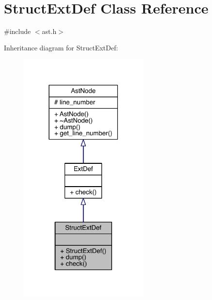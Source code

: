 \hypertarget{class_struct_ext_def}{}\section{Struct\+Ext\+Def Class Reference}
\label{class_struct_ext_def}


{\ttfamily \#include $<$ast.\+h$>$}



Inheritance diagram for Struct\+Ext\+Def\+:\nopagebreak
\begin{figure}[H]
\begin{center}
\leavevmode
\includegraphics[width=186pt]{class_struct_ext_def__inherit__graph}
\end{center}
\end{figure}


